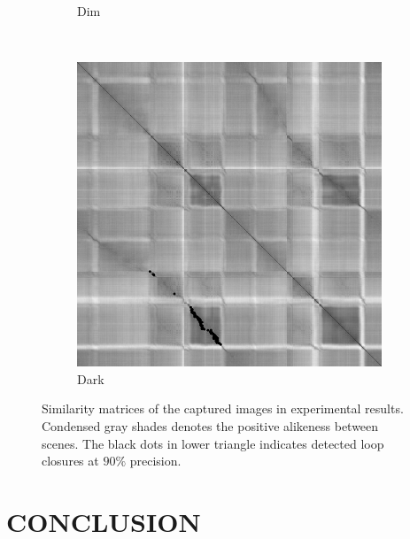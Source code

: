 \documentclass[]{spie}  %
\begin{document}
\begin{figure}
\begin{subfigure}[b]{0.30\textwidth}
        \caption{Dim}
        \label{subfig:dist_dim}
        \end{subfigure}
         ~ 
        \begin{subfigure}[b]{0.30\textwidth}
        \centering
        \includegraphics[trim = 0mm 0mm 0mm 0mm, clip, width=\textwidth]{figures/dist_dark.png}    
        \caption{Dark}
        \label{subfig:dist_dark}
        \end{subfigure}
        
        \hspace{-2mm}
        \caption{Similarity matrices of the captured images in experimental results. Condensed gray shades denotes the positive alikeness between scenes. The black dots in lower triangle indicates detected loop closures at $90\%$ precision.}
        \label{fig:dist_matrices}
\end{figure}



\section{CONCLUSION}
\end{document}
